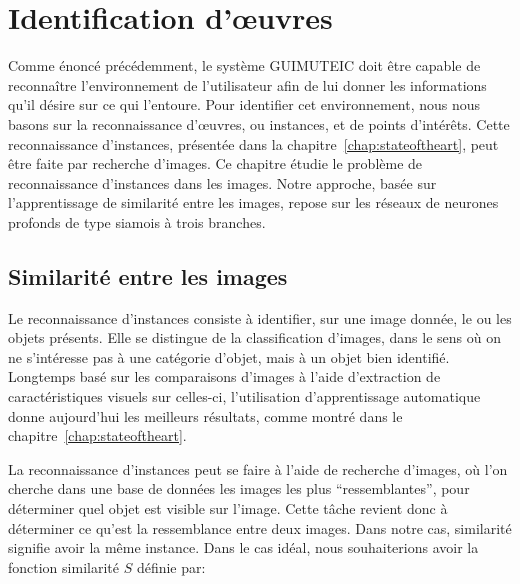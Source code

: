 
\chapter{Identification d'œuvres}
\label{chap:similarite}

Comme énoncé précédemment, le système GUIMUTEIC doit être capable de reconnaître l'environnement de l'utilisateur afin de lui donner les informations qu'il désire sur ce qui l'entoure.
Pour identifier cet environnement, nous nous basons sur la reconnaissance d'œuvres, ou instances, et de points d'intérêts. 
Cette reconnaissance d'instances, présentée dans la chapitre~\ref{chap:stateoftheart}, peut être faite par recherche d'images. 
Ce chapitre étudie le problème de reconnaissance d'instances dans les images. 
Notre approche, basée sur l'apprentissage de similarité entre les images, repose sur les réseaux de neurones profonds de type siamois à trois branches.




\section{Similarité entre les images}
\label{sec:similarite}
Le reconnaissance d'instances consiste à identifier, sur une image donnée, le ou les objets présents. 
Elle se distingue de la classification d'images, dans le sens où on ne s'intéresse pas à une catégorie d'objet, mais à un objet bien identifié. 
Longtemps basé sur les comparaisons d'images à l'aide d'extraction de caractéristiques visuels sur celles-ci, l'utilisation d'apprentissage automatique donne aujourd'hui les meilleurs résultats, comme montré dans le chapitre~\ref{chap:stateoftheart}.

La reconnaissance d'instances peut se faire à l'aide de recherche d'images, où l'on cherche dans une base de données les images les plus ``ressemblantes'', pour déterminer quel objet est visible sur l'image. 
Cette tâche revient donc à déterminer ce qu'est la ressemblance entre deux images. 
Dans notre cas, similarité signifie avoir la même instance. 
Dans le cas idéal, nous souhaiterions avoir la fonction similarité $S$ définie par:

